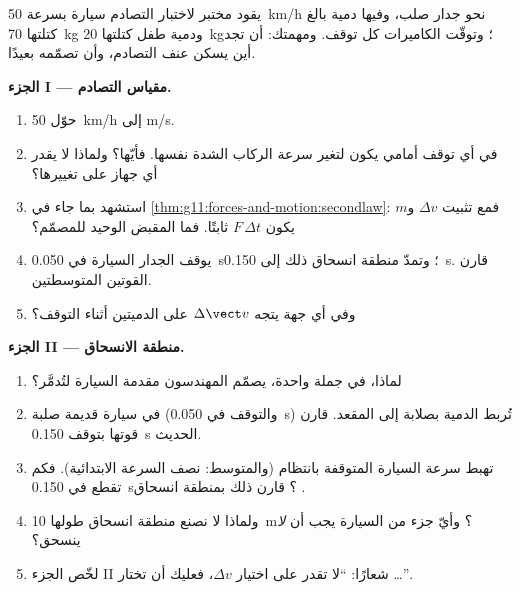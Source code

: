 \begin{problem}
\label{pb:g11:forces-and-motion:1}
يقود مختبر لاختبار التصادم سيارة بسرعة \qty{50}{km/h} نحو جدار
صلب، وفيها دمية بالغ كتلتها \qty{70}{kg} ودمية طفل كتلتها \qty{20}{kg}؛
وتوقّت الكاميرات كل توقف. ومهمتك: أن تجد أين يسكن عنف
التصادم، وأن تصمّمه بعيدًا.

\medskip
\noindent\textbf{الجزء I --- مقياس التصادم.}
\begin{enumerate}
  \item حوّل \qty{50}{km/h} إلى \unit{m/s}.
  \item في أي توقف أمامي يكون لتغير سرعة الركاب الشدة
        نفسها. فأيّها؟ ولماذا لا يقدر أي جهاز على تغييرها؟
  \item استشهد بما جاء في \cref{thm:g11:forces-and-motion:secondlaw}: فمع تثبيت $\Delta v$
        و$m$ يكون $F\,\Delta t$ ثابتًا. فما المقبض الوحيد للمصمّم؟
  \item يوقف الجدار السيارة في \qty{0.050}{s}؛ وتمدّ منطقة انسحاق
        ذلك إلى \qty{0.150}{s}. قارن القوتين المتوسطتين.
  \item وفي أي جهة يتجه $\Delta \vect v$  على
        الدميتين أثناء التوقف؟
\end{enumerate}

\medskip
\noindent\textbf{الجزء II --- منطقة الانسحاق.}
\begin{enumerate}[resume]
  \item لماذا، في جملة واحدة، يصمّم المهندسون مقدمة السيارة
        لتُدمَّر؟
  \item في سيارة قديمة صلبة (والتوقف في \qty{0.050}{s}) تُربط الدمية
        بصلابة إلى المقعد. قارن قوتها بتوقف \qty{0.150}{s} الحديث.
  \item تهبط سرعة السيارة المتوقفة بانتظام (والمتوسط: نصف السرعة الابتدائية).
        فكم تقطع في \qty{0.150}{s}؟ قارن ذلك بمنطقة انسحاق .
  \item ولماذا لا نصنع منطقة انسحاق طولها \qty{10}{m}؟ وأيّ جزء من السيارة
        يجب أن \emph{لا} ينسحق؟
  \item لخّص الجزء II شعارًا: ``لا تقدر على اختيار $\Delta v$،
        فعليك أن تختار \dots''.
\end{enumerate}


\end{problem}
